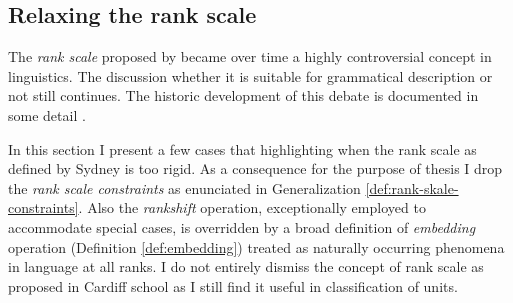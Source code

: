 \subsection{Relaxing the rank scale}
\label{sec:rank-system}

The \textit{rank scale} proposed by \citet{Halliday2002} became over time a highly controversial concept in linguistics. The discussion whether it is suitable for grammatical description or not still continues. The historic development of this debate is documented in some detail \cite[309--338]{Fawcett2000}. %



In this section I present a few cases that highlighting when the rank scale as defined by Sydney is too rigid. As a consequence for the purpose of thesis I drop the \textit{rank scale constraints} as enunciated in Generalization \ref{def:rank-skale-constraints}. Also the \textit{rankshift} operation, exceptionally employed to accommodate special cases, is overridden by a broad definition of \textit{embedding}  operation (Definition \ref{def:embedding}) treated as naturally occurring phenomena in language at all ranks. I do not entirely dismiss the concept of rank scale as proposed in Cardiff school as I still find it useful in classification of units.

